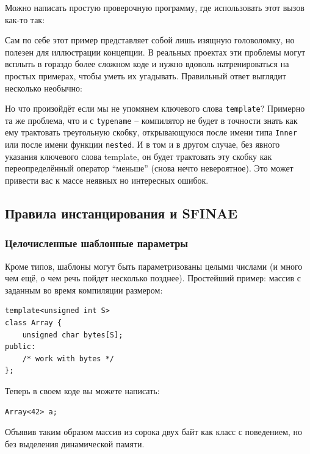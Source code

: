\documentclass[a4paper,12pt,oneside]{article}
\begin{document}
Можно написать простую проверочную программу, где использовать этот вызов как-то так:



Сам по себе этот пример представляет собой лишь изящную головоломку, но полезен для иллюстрации концепции. В реальных проектах эти проблемы могут всплыть в гораздо более сложном коде и нужно вдоволь натренироваться на простых примерах, чтобы уметь их угадывать. Правильный ответ выглядит несколько необычно:



Но что произойдёт если мы не упомянем ключевого слова \lstinline!template!? Примерно та же проблема, что и с \lstinline!typename! -- компилятор не будет в точности знать как ему трактовать треугольную скобку, открывающуюся после имени типа \lstinline!Inner! или после имени функции \lstinline!nested!. И в том и в другом случае, без явного указания ключевого слова template, он будет трактовать эту скобку как переопределённый оператор ``меньше'' (снова нечто невероятное). Это может привести вас к массе неявных но интересных ошибок.

\subsection{Правила инстанцирования и SFINAE}

\subsubsection{Целочисленные шаблонные параметры}

Кроме типов, шаблоны могут быть параметризованы целыми числами (и много чем ещё, о чем речь пойдет несколько позднее). Простейший пример: массив с заданным во время компиляции размером:

\begin{lstlisting}
template<unsigned int S>
class Array {
    unsigned char bytes[S];
public:
    /* work with bytes */
};
\end{lstlisting}

Теперь в своем коде вы можете написать:

\begin{lstlisting}
Array<42> a;
\end{lstlisting}

Объявив таким образом массив из сорока двух байт как класс с поведением, но без выделения динамической памяти.
\end{document}
